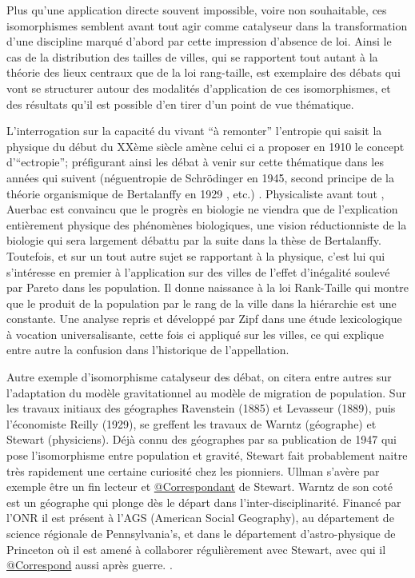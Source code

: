 Plus qu'une application directe souvent impossible, voire non souhaitable, ces isomorphismes semblent avant tout agir comme catalyseur dans la transformation d'une discipline marqué d'abord par cette impression d'absence de loi. Ainsi le cas de la distribution des tailles de villes, qui se rapportent tout autant à la théorie des lieux centraux que de la loi rang-taille, est exemplaire des débats qui vont se structurer autour des modalités d'application de ces isomorphismes, et des résultats qu'il est possible d'en tirer d'un point de vue thématique. 

L'interrogation sur la capacité du vivant \enquote{à remonter} l'entropie qui saisit la physique du début du XXème siècle amène celui ci a proposer en 1910 le concept d'\enquote{ectropie}; préfigurant ainsi les débat à venir sur cette thématique dans les années qui suivent (néguentropie de Schrödinger en 1945, second principe de la théorie organismique de Bertalanffy en 1929 \autocite[475]{Pouvreau2013}, etc.) \autocite[80]{Pouvreau2013}. Physicaliste avant tout \autocite[87]{Pouvreau2013}, Auerbac est convaincu que le progrès en biologie ne viendra que de l'explication entièrement physique des phénomènes biologiques, une vision réductionniste de la biologie qui sera largement débattu par la suite dans la thèse de Bertalanffy. Toutefois, et sur un tout autre sujet se rapportant à la physique, c'est lui qui s’intéresse en premier à l'application sur des villes de l'effet d'inégalité soulevé par Pareto dans les population.\autocite{Auerbach1913} Il donne naissance à la loi Rank-Taille qui montre que le produit de la population par le rang de la ville dans la hiérarchie est une constante. Une analyse repris et développé par Zipf dans une étude lexicologique à vocation universalisante, cette fois ci appliqué sur les villes, ce qui explique entre autre la confusion dans l’historique de l’appellation.

Autre exemple d'isomorphisme catalyseur des débat, on citera entre autres sur l'adaptation du modèle gravitationnel au modèle de migration de population. Sur les travaux initiaux des géographes Ravenstein (1885) et Levasseur (1889), puis l'économiste Reilly (1929), se greffent les travaux de Warntz (géographe) et Stewart (physiciens). Déjà connu des géographes par sa publication de 1947 qui pose l'isomorphisme entre population et gravité, Stewart fait probablement naitre très rapidement une certaine curiosité chez les pionniers. Ullman s'avère par exemple être un fin lecteur \autocite[61]{Glick1988} et \href{http://nwda.orbiscascade.org/ark:/80444/xv01385}{@Correspondant} de Stewart. Warntz de son coté est un géographe qui plonge dès le départ dans l'inter-disciplinarité. Financé par l'ONR il est présent à l'AGS (American Social Geography), au département de science régionale de Pennsylvania's, et dans le département d'astro-physique de Princeton où il est amené à collaborer régulièrement avec Stewart, avec qui il \href{http://rmc.library.cornell.edu/EAD/htmldocs/RMM04392.html}{@Correspond} aussi après guerre. \autocite{Barnes2006a}. 

